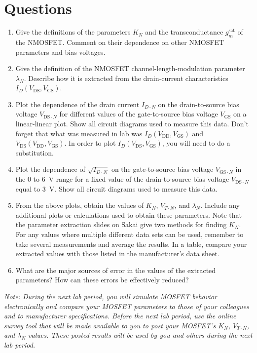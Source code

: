 \documentclass[12pt]{../manual}
\begin{document}
\section{Questions}
\begin{enumerate}
\item Give the definitions of the parameters $K_N$ and the transconductance $g_m^\mathrm{sat}$ of the NMOSFET. Comment on their dependence on other NMOSFET parameters and bias voltages.
\item Give the definition of the NMOSFET channel-length-modulation parameter $\lambda_N$. Describe how it is extracted from the drain-current characteristics $I_D(V_{\mathrm{DS}}, V_{\mathrm{GS}})$.
\item Plot the dependence of the drain current $I_{D \cdot N}$ on the drain-to-source bias voltage $V_{\mathrm{DS}\cdot N}$ for different values of the gate-to-source bias voltage $V_{\mathrm{GS}}$ on a linear-linear plot. Show all circuit diagrams used to measure this data. Don't forget that what was measured in lab was $I_D(V_{\mathrm{DD}}, V_{\mathrm{GS}})$ and $V_{\mathrm{DS}}(V_{\mathrm{DD}}, V_{\mathrm{GS}})$. In order to plot $I_D(V_{\mathrm{DS}}, V_{\mathrm{GS}})$, you will need to do a substitution.
\item Plot the dependence of $\sqrt{I_{D \cdot N}}$ on the gate-to-source bias voltage $ V_{\mathrm{GS} \cdot N}$ in the 0 to \SI{6}{\volt} range for a fixed value of the drain-to-source bias voltage $V_{\mathrm{DS} \cdot N}$ equal to \SI{3}{\volt}. Show all circuit diagrams used to measure this data.
\item From the above plots, obtain the values of $K_N$, $V_{T \cdot N}$, and $\lambda_N$. Include any additional plots or calculations used to obtain these parameters. Note that the parameter extraction slides on Sakai give two methods for finding $K_N$. For any values where multiple different data sets can be used, remember to take several measurements and average the results. In a table, compare your extracted values with those listed in the manufacturer's data sheet.
\item What are the major sources of error in the values of the extracted parameters? How can these errors be effectively reduced?
\end{enumerate}
\textit{Note: During the next lab period, you will simulate MOSFET behavior electronically and compare your MOSFET parameters to those of your colleagues and to manufacturer specifications. Before the next lab period, use the online survey tool that will be made available to you to post your MOSFET's $K_N$, $V_{T \cdot N}$, and $\lambda_N$ values. These posted results will be used by you and others during the next lab period.}
\end{document}
